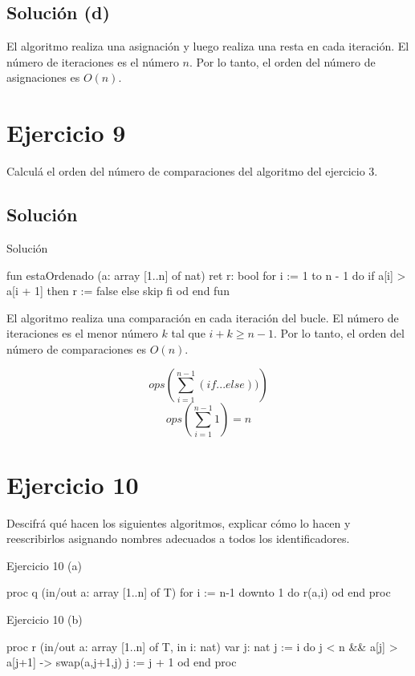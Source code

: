 \subsection{Solución (d)}
El algoritmo realiza una asignación y luego realiza una resta en cada iteración. El número de iteraciones es el número $n$. Por lo tanto, el orden del número de asignaciones es $O(n)$.


\section{Ejercicio 9}
Calculá el orden del número de comparaciones del algoritmo del ejercicio 3.

\subsection{Solución}

\begin{codebox}{Solución}
\begin{pascallike}
fun estaOrdenado (a: array [1..n] of nat) ret r: bool
    for i := 1 to n - 1 do
    if a[i] > a[i + 1] then
        r := false
    else
        skip
    fi
    od
end fun
\end{pascallike}
\end{codebox}

El algoritmo realiza una comparación en cada iteración del bucle. El número de iteraciones es el menor número $k$ tal que $i + k \geq n-1$. Por lo tanto, el orden del número de comparaciones es $O(n)$.

$$ ops\left( \sum_{i=1}^{n-1} (if...else)) \right)$$
$$ ops\left( \sum_{i=1}^{n-1} 1 \right) = n$$

\section{Ejercicio 10}
Descifrá qué hacen los siguientes algoritmos, explicar cómo lo hacen y reescribirlos asignando nombres adecuados a todos los identificadores.

\begin{codebox}{Ejercicio 10 (a)}
\begin{pascallike}
proc q (in/out a: array [1..n] of T)
    for i := n-1 downto 1 do
    r(a,i)
    od
end proc
\end{pascallike}
\end{codebox}

\begin{codebox}{Ejercicio 10 (b)}
\begin{pascallike}
proc r (in/out a: array [1..n] of T, in i: nat)
    var j: nat
    j := i
    do j < n && a[j] > a[j+1] ->
    swap(a,j+1,j)
    j := j + 1
    od
end proc
\end{pascallike}
\end{codebox}

